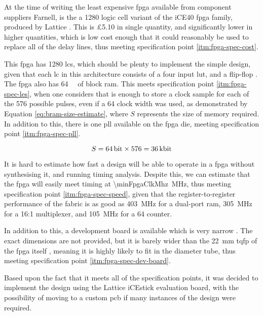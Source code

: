 At the time of writing the least expensive \gls{fpga} available from component suppliers Farnell, is the a 1280 logic cell variant of the iCE40 \gls{fpga} family, produced by Lattice \cite{farnell2017}. This is \pounds5.10 in single quantity, and significantly lower in higher quantities, which is low cost enough that it could reasonably be used to replace all of the delay lines, thus meeting specification point \ref{itm:fpga-spec-cost}.

This \gls{fpga} has 1280 \glspl{lc}, which should be plenty to implement the simple design, given that each \gls{lc} in this architecture consists of a four input \gls{lut}, and a flip-flop \cite[p.2-2]{lattice2017a}. The \gls{fpga} also has \SI{64}{\kilo\bit} of block \gls{ram}. This meets specification point \ref{itm:fpga-spec-les}, when one considers that is enough to store a clock sample for each of the 576 possible pulses, even if a \SI{64}{\bit} clock width was used, as demonstrated by Equation \ref{eq:bram-size-estimate}, where $S$ represents the size of memory required. In addition to this, there is one \gls{pll} available on the \gls{fpga} die, meeting specification point \ref{itm:fpga-spec-pll}.

\begin{equation}
	S = \SI{64}{\bit} \times 576 = \SI{36}{\kilo\bit} \label{eq:bram-size-estimate}
\end{equation}

It is hard to estimate how fast a design will be able to operate in a \gls{fpga} without synthesising it, and running timing analysis. Despite this, we can estimate that the \gls{fpga} will easily meet timing at \SI{\minFpgaClkMhz}{\mega\hertz}, thus meeting specification point \ref{itm:fpga-spec-speed}, given that the register-to-register performance of the fabric is as good as \SI{403}{\mega\hertz} for a dual-port \gls{ram}, \SI{305}{\mega\hertz} for a 16:1 multiplexer, and \SI{105}{\mega\hertz} for a \SI{64}{\bit} counter.

In addition to this, a development board is available which is very narrow \cite{lattice2017b}. The exact dimensions are not provided, but it is barely wider than the \SI{22}{\milli\metre} \gls{tqfp} of the \gls{fpga} itself \cite[p.2]{lattice2017b}, meaning it is highly likely to fit in the  diameter tube, thus meeting specification point \ref{itm:fpga-spec-dev-board}.

Based upon the fact that it meets all of the specification points, it was decided to implement the design using the Lattice iCEstick evaluation board, with the possibility of moving to a custom \gls{pcb} if many instances of the design were required.

